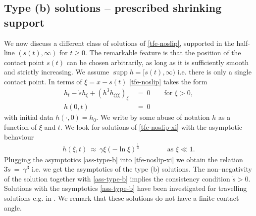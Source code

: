 \documentclass[pagesize,pdftex]{amsart}
\newcommand{\gam}{\gamma}
\DeclareMathOperator{\supp}{supp}
\begin{document}
\subsection{Type (b) solutions -- prescribed shrinking support \label{IncreasingS}}

We now discuss a different class of solutions of \eqref{tfe-noslip}, supported
in the half-line $(s(t) ,\infty)$ for $t \geq 0$. The remarkable feature is that
the position of the contact point $s(t)$ can be chosen arbitrarily, as long as
it is sufficiently smooth and strictly increasing. We assume
$\supp h = [s(t),\infty)$ i.e. there is only a single contact point. In terms of
$\xi = x - s(t)$ \eqref{tfe-noslip} takes the form
  \begin{align} \label{tfe-noslip-xi} %
    h_t  - \dot s h_\xi +(h^3 h_{\xi\xi\xi})_\xi \ &= \ 0  \qquad 
    \text{for $\xi > 0$}, \\
    h(0,t) \ &= \ 0
  \end{align}
  with initial data $h(\cdot,0) = h_0$. We write by some abuse of notation $h$
  as a function of $\xi$ and $t$. We look for solutions of \eqref{tfe-noslip-xi}
  with the asymptotic behaviour
\begin{align}   \label{ass-type-b} %
  h(\xi,t) \ \approx \ \gam \xi  (- \ln \xi)^{\frac 13} \qquad\qquad %
  \text{as } \xi \ll 1.
\end{align}
Plugging the asymptotics \eqref{ass-type-b} into \eqref{tfe-noslip-xi} we obtain
the relation $3 \dot s \ = \ \gam^3$ i.e. we get the
asymptotics \label{def-typeb} of the type (b) solutions. The non--negativity of
the solution together with \eqref{ass-type-b} implies the consistency condition
$\dot s >0$. Solutions with the asymptotics \eqref{ass-type-b} have been
investigated for travelling solutions e.g. in
\cite{BoattoEtal-1993,BowenKing-2001}. We remark that these solutions do not
have a finite contact angle.

\medskip
\end{document}
